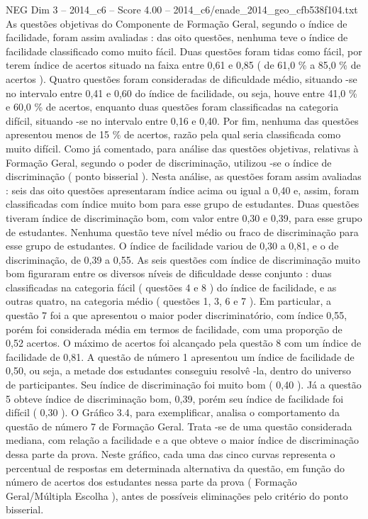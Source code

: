 \begin{textsample}{NEG Dim 3 – 2014\_c6 – Score 4.00 – 2014\_c6/enade\_2014\_geo\_cfb538f104.txt}
As questões objetivas do Componente de Formação Geral, segundo o índice de facilidade, foram assim avaliadas : das oito questões, nenhuma teve o índice de facilidade classificado como muito fácil.
Duas questões foram tidas como fácil, por terem índice de acertos situado na faixa entre 0,61 e 0,85 ( de 61,0 \% a 85,0 \% de acertos ).
Quatro questões foram consideradas de dificuldade médio, situando -se no intervalo entre 0,41 e 0,60 do índice de facilidade, ou seja, houve entre 41,0 \% e 60,0 \% de acertos, enquanto duas questões foram classificadas na categoria difícil, situando -se no intervalo entre 0,16 e 0,40.
Por fim, nenhuma das questões apresentou menos de 15 \% de acertos, razão pela qual seria classificada como muito difícil.
Como já comentado, para análise das questões objetivas, relativas à Formação Geral, segundo o poder de discriminação, utilizou -se o índice de discriminação ( ponto bisserial ).
Nesta análise, as questões foram assim avaliadas : seis das oito questões apresentaram índice acima ou igual a 0,40 e, assim, foram classificadas com índice muito bom para esse grupo de estudantes.
Duas questões tiveram índice de discriminação bom, com valor entre 0,30 e 0,39, para esse grupo de estudantes.
Nenhuma questão teve nível médio ou fraco de discriminação para esse grupo de estudantes.
O índice de facilidade variou de 0,30 a 0,81, e o de discriminação, de 0,39 a 0,55.
As seis questões com índice de discriminação muito bom figuraram entre os diversos níveis de dificuldade desse conjunto : duas classificadas na categoria fácil ( questões 4 e 8 ) do índice de facilidade, e as outras quatro, na categoria médio ( questões 1, 3, 6 e 7 ).
Em particular, a questão 7 foi a que apresentou o maior poder discriminatório, com índice 0,55, porém foi considerada média em termos de facilidade, com uma proporção de 0,52 acertos.
O máximo de acertos foi alcançado pela questão 8 com um índice de facilidade de 0,81.
A questão de número 1 apresentou um índice de facilidade de 0,50, ou seja, a metade dos estudantes conseguiu resolvê -la, dentro do universo de participantes.
Seu índice de discriminação foi muito bom ( 0,40 ).
Já a questão 5 obteve índice de discriminação bom, 0,39, porém seu índice de facilidade foi difícil ( 0,30 ).
O Gráfico 3.4, para exemplificar, analisa o comportamento da questão de número 7 de Formação Geral.
Trata -se de uma questão considerada mediana, com relação a facilidade e a que obteve o maior índice de discriminação dessa parte da prova.
Neste gráfico, cada uma das cinco curvas representa o percentual de respostas em determinada alternativa da questão, em função do número de acertos dos estudantes nessa parte da prova ( Formação Geral/Múltipla Escolha ), antes de possíveis eliminações pelo critério do ponto bisserial.

\end{textsample}
